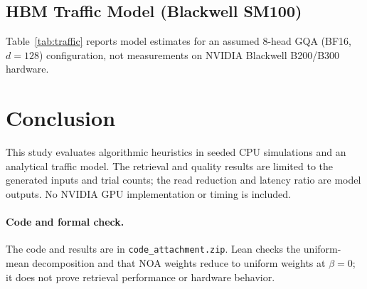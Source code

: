 \documentclass[10pt,twocolumn]{article}
\begin{document}
\subsection{HBM Traffic Model (Blackwell SM100)}
Table~\ref{tab:traffic} reports model estimates for an assumed 8-head GQA (BF16, $d=128$) configuration, not measurements on NVIDIA Blackwell B200/B300 hardware.
\begin{table}[h]
\centering
\footnotesize
\setlength{\tabcolsep}{3.5pt}
\caption{HBM read volume and projected speedup on Blackwell.}
\label{tab:traffic}
\end{table}

\section{Conclusion}
This study evaluates algorithmic heuristics in seeded CPU simulations and an analytical traffic model. The retrieval and quality results are limited to the generated inputs and trial counts; the read reduction and latency ratio are model outputs. No NVIDIA GPU implementation or timing is included.

\paragraph{Code and formal check.} The code and results are in \texttt{code\_attachment.zip}. Lean checks the uniform-mean decomposition and that NOA weights reduce to uniform weights at $\beta=0$; it does not prove retrieval performance or hardware behavior.
\end{document}

